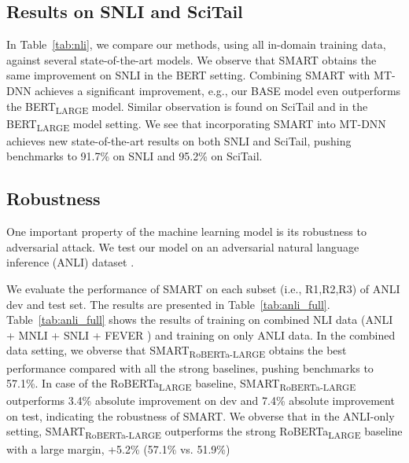 \documentclass[11pt]{article} \usepackage{url}
\newcommand\model{SMART}
\begin{document}
\subsection{Results on SNLI and SciTail}


In Table~\ref{tab:nli}, we compare our methods, using all in-domain training data, against several state-of-the-art models. We observe that {\model} obtains the same improvement on SNLI in the BERT setting. Combining {\model} with MT-DNN achieves a significant improvement, e.g., our BASE model even outperforms the BERT\textsubscript{LARGE} model. Similar observation is found on SciTail and in the BERT\textsubscript{LARGE} model setting. We see that incorporating {\model} into MT-DNN achieves new state-of-the-art results on both SNLI and SciTail, pushing benchmarks to 91.7\% on SNLI and 95.2\% on SciTail.  











\subsection{Robustness}


One important property of the machine learning model is its robustness to adversarial attack. We test our model on an adversarial natural language inference (ANLI) dataset \cite{nie2019adversarial}. 

We evaluate the performance of SMART on each subset (i.e., R1,R2,R3) of ANLI dev and test set. The results are presented in Table~\ref{tab:anli_full}. Table~\ref{tab:anli_full} shows the results of training on combined NLI data (ANLI \cite{nie2019adversarial} + MNLI \cite{mnli2018} + SNLI \cite{snli2015} + FEVER \cite{thorne2018fever}) and training on only ANLI data. In the combined data setting, we obverse that 	{\model}\textsubscript{RoBERTa-LARGE} obtains the best performance compared with all the strong baselines, pushing benchmarks to 57.1\%. In case of the RoBERTa\textsubscript{LARGE} baseline,  {\model}\textsubscript{RoBERTa-LARGE} outperforms 3.4\% absolute improvement on dev and 7.4\% absolute improvement on test, indicating the robustness of {\model}. We obverse that in the ANLI-only setting, {\model}\textsubscript{RoBERTa-LARGE} outperforms the strong RoBERTa\textsubscript{LARGE} baseline with a large margin, +5.2\% (57.1\% vs. 51.9\%) 
\end{document}
